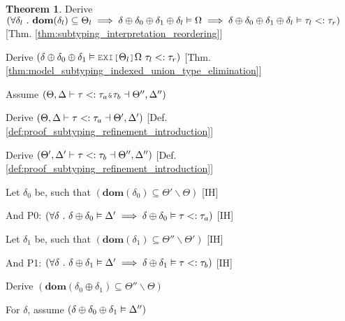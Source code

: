 \documentclass[acmsmall]{acmart}
\theoremstyle{definition}
\newtheorem{theorem}{Theorem}[section]
\begin{document}
\begin{theorem}
  \item \I\I \N Derive $(
    \forall \delta_l \ .\ 
    \textbf{dom}(\delta_l) \subseteq \Theta_l
    \implies
    \delta \oplus \delta_0 \oplus \delta_1 \oplus \delta_l \vDash \Omega
    \implies
    \delta \oplus \delta_0 \oplus \delta_1 \oplus \delta_l \vDash \tau_l <: \tau_r
  )$ [Thm. \ref{thm:subtyping_interpretation_reordering}]

  \item \I\I \N Derive $(
    \delta \oplus \delta_0 \oplus \delta_1 \satisfies \J{EXI[} \Theta_l \J{]} \Omega\ \tau_l \subtypes \tau_r
  )$ [Thm. \ref{thm:model_subtyping_indexed_union_type_elimination}]



  \item \N Assume $(
    \Theta, \Delta \entails
    \tau \subtypes \tau_{a}\J{\&}\tau_{b} \given \Theta'', \Delta''
  )$

  \item \I \N Derive $(
    \Theta, \Delta \vdash
    \tau <: \tau_{a} \dashv \Theta', \Delta' 
  )$ [Def. \ref{def:proof_subtyping_refinement_introduction}]

  \item \I \N Derive $(
    \Theta', \Delta' \vdash
    \tau <: \tau_{b} \dashv \Theta'', \Delta''
  )$ [Def. \ref{def:proof_subtyping_refinement_introduction}]

  \item \I \N Let $\delta_0$ be, such that $(
    \textbf{dom}(\delta_0) \subseteq \Theta' \backslash \Theta
  )$ [IH]
  \item \I \N And P0: $(
    \forall \delta \ .\  
    \delta \oplus \delta_0 \vDash \Delta' 
    \implies 
    \delta \oplus \delta_0 \vDash \tau <: \tau_a
  )$ [IH]

  \item \I \N Let $\delta_1$ be, such that $(
    \textbf{dom}(\delta_1) \subseteq \Theta'' \backslash \Theta'
  )$ [IH]
  \item \I \N And P1: $(
    \forall \delta \ .\  
    \delta \oplus \delta_1 \vDash \Delta' 
    \implies 
    \delta \oplus \delta_1 \vDash \tau <: \tau_b
  )$ [IH]

  \item \I \N Derive $(
    \textbf{dom}(\delta_0 \oplus \delta_1) \subseteq \Theta'' \backslash \Theta
  )$
  \item \I \N For $\delta$, 
    assume $(\delta \oplus \delta_0 \oplus \delta_1 \vDash \Delta'')$


\end{theorem}
\end{document}
